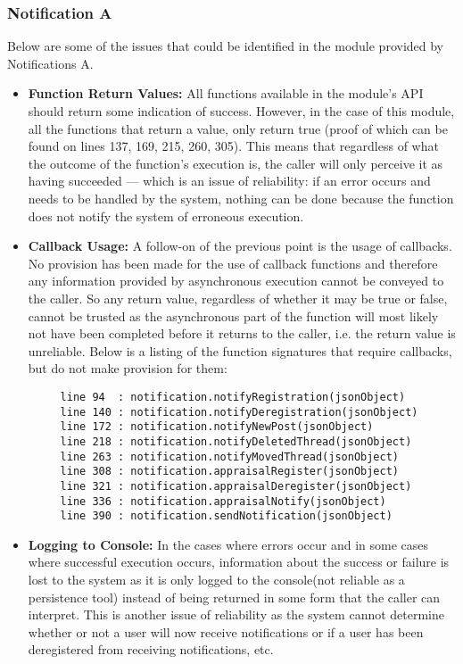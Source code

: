 
\subsubsection*{Notification A}
Below are some of the issues that could be identified in the module provided by Notifications A.
\begin{itemize}
    \item \textbf{Function Return Values:}\newline
     All functions available in the module's API should return some indication of success.
     However, in the case of this module, all the functions that return a value, only return true (proof of which can be found on lines 137, 169, 215, 260, 305). This means that 
     regardless of what the outcome of the function's execution is, the caller will only perceive it as 
     having succeeded --- which is an issue of reliability: if an error occurs and needs to be handled by the system, 
     nothing can be done because the function does not notify the system of erroneous execution.
     \item \textbf{Callback Usage:}\newline
     A follow-on of the previous point is the usage of callbacks.
     No provision has been made for the use of callback functions and therefore any 
     information provided by asynchronous execution cannot be conveyed to the caller. So any return value, regardless of whether it may be true or false, cannot be trusted as the asynchronous part of the function will most likely not have been completed before it returns to the caller, i.e. the return value is unreliable.\newline
     Below is a listing of the function signatures that require callbacks, but do not make provision for them:
     \begin{lstlisting}
     line 94  : notification.notifyRegistration(jsonObject)
     line 140 : notification.notifyDeregistration(jsonObject)
     line 172 : notification.notifyNewPost(jsonObject)
     line 218 : notification.notifyDeletedThread(jsonObject)
     line 263 : notification.notifyMovedThread(jsonObject)
     line 308 : notification.appraisalRegister(jsonObject)
     line 321 : notification.appraisalDeregister(jsonObject)
     line 336 : notification.appraisalNotify(jsonObject)
     line 390 : notification.sendNotification(jsonObject)
     \end{lstlisting}
     \item \textbf{Logging to Console:}\newline
     In the cases where errors occur and in some cases where successful execution occurs, information about the success or failure is lost to the system as it is only logged to the console(not reliable as a persistence tool) instead of being returned in some form that the caller can interpret. This is another issue of reliability as the system cannot determine whether or not a user will now receive notifications or if a user has been deregistered from receiving notifications, etc.
\end{itemize}
